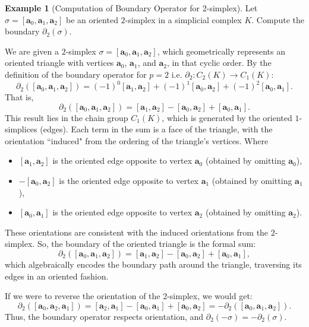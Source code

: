 \documentclass[12pt,oneside,reqno]{amsart}
\theoremstyle{plain}
\theoremstyle{definition}
\newtheorem{example}{Example}[section]
\theoremstyle{remark}
\newcommand{\0}{{\textbf{0}}}
\begin{document}
\begin{example}[Computation of Boundary Operator for 2-simplex]\label{eq:Computation of Boundary Operator for 2 simplex}
Let $\sigma = [\mathbf{a}_0, \mathbf{a}_1, \mathbf{a}_2]$ be an oriented $2$-simplex in a simplicial complex $K$. Compute the boundary $\partial_2(\sigma)$.

We are given a $2$-simplex $\sigma = [\mathbf{a}_0, \mathbf{a}_1, \mathbf{a}_2]$, which geometrically represents an oriented triangle with vertices $\mathbf{a}_0$, $\mathbf{a}_1$, and $\mathbf{a}_2$, in that cyclic order. By the definition of the boundary operator for $p = 2$ i.e. $\partial_2 \colon C_{2}(K) \to C_{1}(K)$:
\[
\partial_2([\mathbf{a}_0, \mathbf{a}_1, \mathbf{a}_2]) = 
(-1)^0 [\mathbf{a}_1, \mathbf{a}_2] 
+ (-1)^1 [\mathbf{a}_0, \mathbf{a}_2] 
+ (-1)^2 [\mathbf{a}_0, \mathbf{a}_1].
\]
That is,
\[
\partial_2([\mathbf{a}_0, \mathbf{a}_1, \mathbf{a}_2]) = 
[\mathbf{a}_1, \mathbf{a}_2] 
- [\mathbf{a}_0, \mathbf{a}_2] 
+ [\mathbf{a}_0, \mathbf{a}_1].
\]
This result lies in the chain group $C_1(K)$, which is generated by the oriented $1$-simplices (edges). Each term in the sum is a face of the triangle, with the orientation ``induced" from the ordering of the triangle’s vertices. Where 
\begin{itemize}
\item $[\mathbf{a}_1, \mathbf{a}_2]$ is the oriented edge opposite to vertex $\mathbf{a}_0$ (obtained by omitting $\mathbf{a}_0$),
\item $-[\mathbf{a}_0, \mathbf{a}_2]$ is the oriented edge opposite to vertex $\mathbf{a}_1$ (obtained by omitting $\mathbf{a}_1$),
\item $[\mathbf{a}_0, \mathbf{a}_1]$ is the oriented edge opposite to vertex $\mathbf{a}_2$ (obtained by omitting $\mathbf{a}_2$).
\end{itemize}
These orientations are consistent with the induced orientations from the $2$-simplex. So, the boundary of the oriented triangle is the formal sum:
\[
\partial_2([\mathbf{a}_0, \mathbf{a}_1, \mathbf{a}_2]) = 
[\mathbf{a}_1, \mathbf{a}_2] 
- [\mathbf{a}_0, \mathbf{a}_2] 
+ [\mathbf{a}_0, \mathbf{a}_1],
\]
which algebraically encodes the boundary path around the triangle, traversing its edges in an oriented fashion.

If we were to reverse the orientation of the 2-simplex, we would get:
\[
\partial_2([\mathbf{a}_0, \mathbf{a}_2, \mathbf{a}_1]) = 
[\mathbf{a}_2, \mathbf{a}_1] 
- [\mathbf{a}_0, \mathbf{a}_1] 
+ [\mathbf{a}_0, \mathbf{a}_2] = -\partial_2([\mathbf{a}_0, \mathbf{a}_1, \mathbf{a}_2]).
\]
Thus, the boundary operator respects orientation, and $\partial_2(-\sigma) = -\partial_2(\sigma)$.
\end{example}
\end{document}
